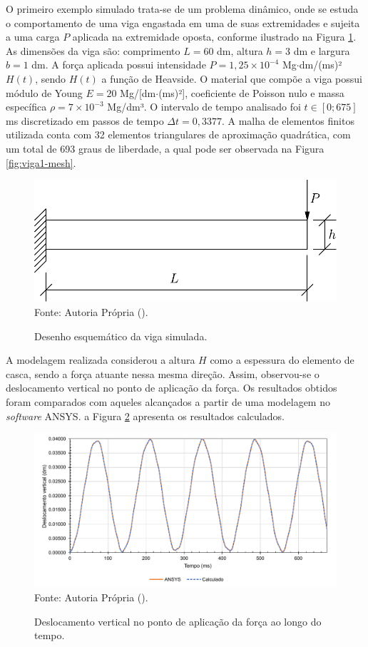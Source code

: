 O primeiro exemplo simulado trata-se de um problema dinâmico, onde se estuda o comportamento de uma viga engastada em uma de suas extremidades e sujeita a uma carga $P$ aplicada na extremidade oposta, conforme ilustrado na Figura \ref{fig:viga1}. As dimensões da viga são: comprimento $L=60$ dm, altura $h=3$ dm e largura $b=1$ dm. A força aplicada possui intensidade $P=1,25\times10^{-4}$ Mg$\cdot$dm/(ms)² $H(t)$, sendo $H(t)$ a função de Heavside. O material que compõe a viga possui módulo de Young $E=20$ Mg/[dm$\cdot$(ms)²], coeficiente de Poisson nulo e massa específica $\rho=7\times10^{-3}$ Mg/dm³. O intervalo de tempo analisado foi $t\in[0;675]$ ms discretizado em passos de tempo $\Delta t=0,3377$. A malha de elementos finitos utilizada conta com 32 elementos triangulares de aproximação quadrática, com um total de 693 graus de liberdade, a qual pode ser observada na Figura \ref{fig:viga1-mesh}.

\begin{figure}[h!]
    \centering
    \caption{Desenho esquemático da viga simulada.}
    \includegraphics[width=0.5\linewidth]{Figuras/vigas/viga1.pdf}
    \\Fonte: Autoria Própria (\the\year).
    \label{fig:viga1}
\end{figure}

A modelagem realizada considerou a altura $H$ como a espessura do elemento de casca, sendo a força atuante nessa mesma direção. Assim, observou-se o deslocamento vertical no ponto de aplicação da força. Os resultados obtidos foram comparados com aqueles alcançados a partir de uma modelagem no \textit{software} ANSYS. a Figura \ref{fig:res-viga1} apresenta os resultados calculados.

\begin{figure}[h!]
    \centering
    \caption{Deslocamento vertical no ponto de aplicação da força ao longo do tempo.}
    \includegraphics[width=\linewidth]{Figuras/vigas/res1.pdf}
    \\Fonte: Autoria Própria (\the\year).
    \label{fig:res-viga1}
\end{figure}

